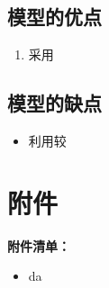 \documentclass{my_paper}
\begin{document}
\subsection{模型的优点}
\begin{enumerate}
    \item 采用

\end{enumerate}

\subsection{模型的缺点}
\begin{itemize}
    \item 利用较

\end{itemize}

\newpage
\begin{center}
\end{center}

\newpage
\section{附件}
\textbf{附件清单：}
\renewcommand\theenumi{\roman{enumi}}
\renewcommand\labelenumi{\textbf{附录\theenumi}}
\begin{itemize}
    \item da 
\end{itemize}



% 
\end{document}
